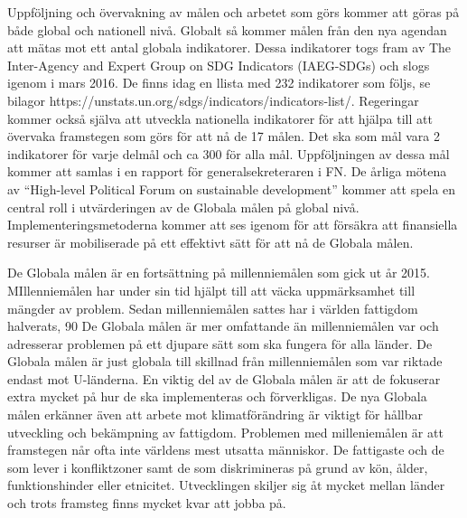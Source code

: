 \documentclass{report}
\begin{document}
Uppföljning och övervakning av målen och arbetet som görs kommer att göras på både global och nationell nivå. Globalt så kommer målen från den nya agendan att mätas mot ett antal globala indikatorer. Dessa indikatorer togs fram av The Inter-Agency and Expert Group on SDG Indicators (IAEG-SDGs) och slogs igenom i mars 2016. \cite{web2030agenda}
De finns idag en llista med 232 indikatorer som följs, se bilagor https://unstats.un.org/sdgs/indicators/indicators-list/.
Regeringar kommer också själva att utveckla nationella indikatorer för att hjälpa till att övervaka framstegen som görs för att nå de 17 målen. Det ska som mål vara 2 indikatorer för varje delmål och ca 300 för alla mål. Uppföljningen av dessa mål kommer att samlas i en rapport för generalsekreteraren i FN. De årliga mötena av  “High-level Political Forum on sustainable development” kommer att spela en central roll i utvärderingen av de Globala målen på global nivå. Implementeringsmetoderna kommer att ses igenom för att försäkra att finansiella resurser är mobiliserade på ett effektivt sätt för att nå de Globala målen.  \cite{web2030agenda}




De Globala målen är en fortsättning på millenniemålen som gick ut år 2015. MIllenniemålen har under sin tid hjälpt till att väcka uppmärksamhet till mängder av problem. Sedan millenniemålen sattes har i världen fattigdom halverats, 90%
De Globala målen är mer omfattande än millenniemålen var och adresserar problemen på ett djupare sätt som ska fungera för alla länder. De Globala målen är just globala till skillnad från millenniemålen som var riktade endast mot U-länderna. En viktig del av de Globala målen är att de fokuserar extra mycket på hur de ska implementeras och förverkligas. De nya Globala målen erkänner även att arbete mot klimatförändring är viktigt för hållbar utveckling och bekämpning av fattigdom. \cite{web2030agenda}
Problemen med milleniemålen är att framstegen når ofta inte världens mest utsatta människor. De fattigaste och de som lever i konfliktzoner samt de som diskrimineras på grund av kön, ålder, funktionshinder eller etnicitet. Utvecklingen skiljer sig åt mycket mellan länder och trots framsteg finns mycket kvar att jobba på. 
\end{document}
